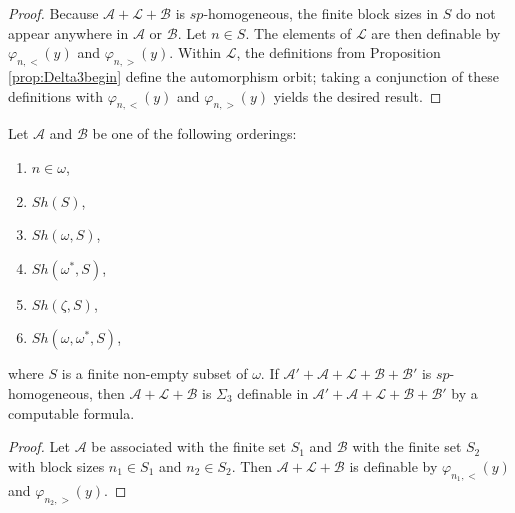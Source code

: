 \documentclass[11pt]{amsart}
\theoremstyle{definition}
\def\A{\mathcal A}
\def\B{\mathcal{B}}
\def\L{\mathcal L}
\begin{document}
\begin{proof}
    Because $\A+\L+\B$ is $sp$-homogeneous, the finite block sizes in $S$ do not appear anywhere in $\A$ or $\B$.
    Let $n\in S$.
    The elements of $\L$ are then definable by $\varphi_{n,<}(y)$ and $\varphi_{n,>}(y)$. 
    Within $\L$, the definitions from Proposition \ref{prop:Delta3begin} define the automorphism orbit; taking a conjunction of these definitions with $\varphi_{n,<}(y)$ and $\varphi_{n,>}(y)$ yields the desired result.
\end{proof}

\begin{corollary}\label{cor:defBoundedSummand}
    Let $\A$ and $\B$ be one of the following orderings:
    \begin{enumerate}
        \item $n\in\omega$,
        \item $Sh(S)$,
        \item $Sh(\omega,S)$,
        \item $Sh(\omega^*,S)$,
        \item $Sh(\zeta,S)$,
        \item $Sh(\omega,\omega^*,S)$,
    \end{enumerate}
    where $S$ is a finite non-empty subset of $\omega$.
    If $\A'+\A+\L+\B+\B'$ is $sp$-homogeneous, then $\A+\L+\B$ is $\Sigma_3$ definable in $\A'+\A+\L+\B+\B'$ by a computable formula.
\end{corollary}

\begin{proof}
    Let $\A$ be associated with the finite set $S_1$ and $\B$ with the finite set $S_2$ with block sizes $n_1\in S_1$ and $n_2\in S_2$. Then
    $\A+\L+\B$ is definable by $\varphi_{n_1,<}(y)$ and $\varphi_{n_2,>}(y)$.
\end{proof}
\end{document}
